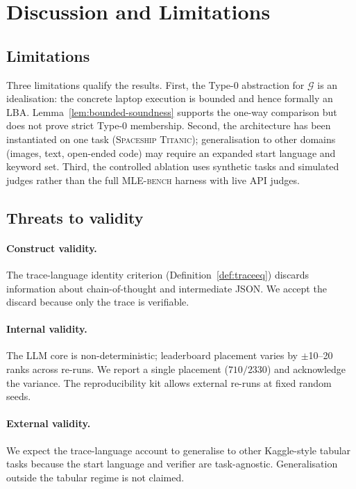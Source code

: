 \section{Discussion and Limitations}
\label{sec:discussion}

\subsection{Limitations}

Three limitations qualify the results.  First, the Type-0 abstraction
for $\mathcal{G}$ is an idealisation: the concrete laptop execution
is bounded and hence formally an LBA.  Lemma~\ref{lem:bounded-soundness}
supports the one-way comparison but does not prove strict Type-0
membership.  Second, the architecture has been instantiated on one
task (\textsc{Spaceship Titanic}); generalisation to other domains
(images, text, open-ended code) may require an expanded start
language and keyword set.  Third, the controlled ablation uses
synthetic tasks and simulated judges rather than the full
\textsc{MLE-bench} harness with live API judges.

\subsection{Threats to validity}

\paragraph{Construct validity.}
The trace-language identity criterion (Definition~\ref{def:traceeq})
discards information about chain-of-thought and intermediate JSON.
We accept the discard because only the trace is verifiable.

\paragraph{Internal validity.}
The LLM core is non-deterministic; leaderboard placement varies by
$\pm$10--20 ranks across re-runs.  We report a single placement
($710/2330$) and acknowledge the variance.  The reproducibility kit
allows external re-runs at fixed random seeds.

\paragraph{External validity.}
We expect the trace-language account to generalise to other
Kaggle-style tabular tasks because the start language and verifier
are task-agnostic.  Generalisation outside the tabular regime is not
claimed.

